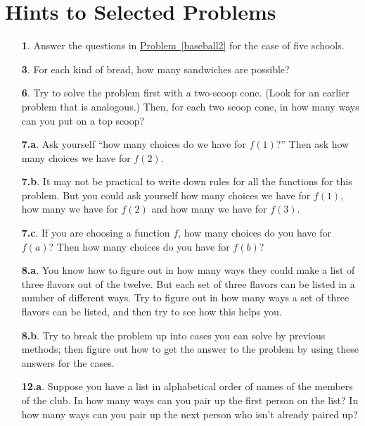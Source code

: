 \documentclass[10pt,]{book}
\theoremstyle{plain}
\theoremstyle{definition}
\theoremstyle{definition}
\numberwithin{equation}{chapter}
\begin{document}
\chapter[{Hints to Selected Problems}]{Hints to Selected Problems}\label{app-hints}
\begin{itemize}[itemsep=1em]
\item[\textbf{1}.]\hypertarget{p-29}{}%
Answer the questions in \hyperref[baseball2]{Problem~\ref{baseball2}} for the case of five schools.%

\item[\textbf{3}.]\hypertarget{p-41}{}%
For each kind of bread, how many sandwiches are possible?%

\item[\textbf{6}.]\hypertarget{p-48}{}%
Try to solve the problem first with a two-scoop cone. (Look for an earlier problem that is analogous.) Then, for each two scoop cone, in how many ways can you put on a top scoop?%

\item[\textbf{7.a}.]\hypertarget{p-52}{}%
Ask yourself ``how many choices do we have for \(f(1)\)?'' Then ask how many choices we have for \(f(2)\).%

\item[\textbf{7.b}.]\hypertarget{p-55}{}%
It may not be practical to write down rules for all the functions for this problem. But you could ask yourself how many choices we have for \(f(1)\), how many we have for \(f(2)\) and how many we have for \(f(3)\).%

\item[\textbf{7.c}.]\hypertarget{p-58}{}%
If you are choosing a function \(f\), how many choices do you have for \(f(a)\)? Then how many choices do you have for \(f(b)\)?%

\item[\textbf{8.a}.]\hypertarget{p-68}{}%
You know how to figure out in how many ways they could make a list of three flavors out of the twelve. But each set of three flavors can be listed in a number of different ways. Try to figure out in how many ways a set of three flavors can be listed, and then try to see how this helps you.%

\item[\textbf{8.b}.]\hypertarget{p-71}{}%
Try to break the problem up into cases you can solve by previous methods; then figure out how to get the answer to the problem by using these answers for the cases.%

\item[\textbf{12.a}.]\hypertarget{p-88}{}%
Suppose you have a list in alphabetical order of names of the members of the club. In how many ways can you pair up the first person on the list? In how many ways can you pair up the next person who isn't already paired up?%


\end{itemize}
\end{document}
